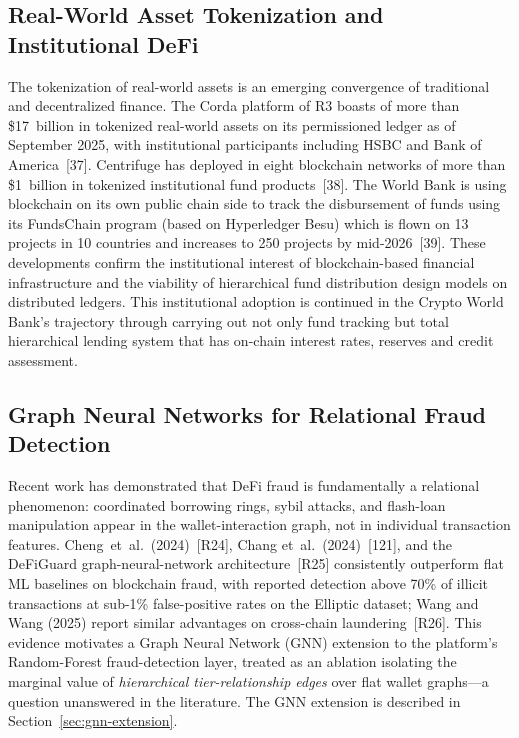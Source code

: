 \documentclass[12pt,a4paper]{report}
\begin{document}
\subsection{Real-World Asset Tokenization and Institutional DeFi}

The tokenization of real-world assets is an emerging convergence of traditional and decentralized finance. The Corda platform of R3 boasts of more than \$17~billion in tokenized real-world assets on its permissioned ledger as of September 2025, with institutional participants including HSBC and Bank of America~[37]. Centrifuge has deployed in eight blockchain networks of more than \$1~billion in tokenized institutional fund products~[38]. The World Bank is using blockchain on its own public chain side to track the disbursement of funds using its FundsChain program (based on Hyperledger Besu) which is flown on 13 projects in 10 countries and increases to 250 projects by mid-2026~[39]. These developments confirm the institutional interest of blockchain-based financial infrastructure and the viability of hierarchical fund distribution design models on distributed ledgers. This institutional adoption is continued in the Crypto World Bank's trajectory through carrying out not only fund tracking but total hierarchical lending system that has on-chain interest rates, reserves and credit assessment.

\subsection{Graph Neural Networks for Relational Fraud Detection}
\label{sec:lit-gnn}

Recent work has demonstrated that DeFi fraud is fundamentally a relational phenomenon: coordinated borrowing rings, sybil attacks, and flash-loan manipulation appear in the wallet-interaction graph, not in individual transaction features. Cheng~et~al.~(2024)~[R24], Chang et~al.~(2024)~[121], and the DeFiGuard graph-neural-network architecture~[R25] consistently outperform flat ML baselines on blockchain fraud, with reported detection above 70\% of illicit transactions at sub-1\% false-positive rates on the Elliptic dataset; Wang and Wang (2025) report similar advantages on cross-chain laundering~[R26]. This evidence motivates a Graph Neural Network (GNN) extension to the platform's Random-Forest fraud-detection layer, treated as an ablation isolating the marginal value of \textit{hierarchical tier-relationship edges} over flat wallet graphs---a question unanswered in the literature. The GNN extension is described in Section~\ref{sec:gnn-extension}.
\end{document}
